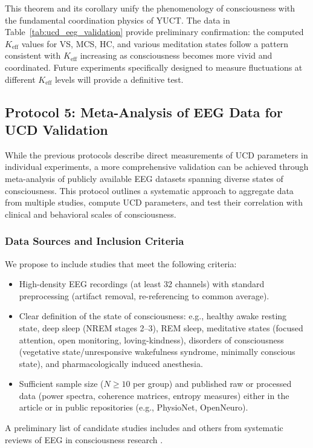 \documentclass[12pt,a4paper]{article}
\newcommand{\Ke}{K_{\mathrm{eff}}}
\begin{document}
	This theorem and its corollary unify the phenomenology of consciousness with the fundamental coordination physics of YUCT. The data in Table~\ref{tab:ucd_eeg_validation} provide preliminary confirmation: the computed \(\Ke\) values for VS, MCS, HC, and various meditation states follow a pattern consistent with \(\Ke\) increasing as consciousness becomes more vivid and coordinated. Future experiments specifically designed to measure fluctuations at different \(\Ke\) levels will provide a definitive test.
	
	\subsection{Protocol 5: Meta-Analysis of EEG Data for UCD Validation}
	\label{sec:protocol5}
	
	While the previous protocols describe direct measurements of UCD parameters in individual experiments, a more comprehensive validation can be achieved through meta-analysis of publicly available EEG datasets spanning diverse states of consciousness. This protocol outlines a systematic approach to aggregate data from multiple studies, compute UCD parameters, and test their correlation with clinical and behavioral scales of consciousness.
	
	\subsubsection{Data Sources and Inclusion Criteria}
	We propose to include studies that meet the following criteria:
	\begin{itemize}
		\item High-density EEG recordings (at least 32 channels) with standard preprocessing (artifact removal, re-referencing to common average).
		\item Clear definition of the state of consciousness: e.g., healthy awake resting state, deep sleep (NREM stages 2–3), REM sleep, meditative states (focused attention, open monitoring, loving-kindness), disorders of consciousness (vegetative state/unresponsive wakefulness syndrome, minimally conscious state), and pharmacologically induced anesthesia.
		\item Sufficient sample size (\(N \geq 10\) per group) and published raw or processed data (power spectra, coherence matrices, entropy measures) either in the article or in public repositories (e.g., PhysioNet, OpenNeuro).
	\end{itemize}
	A preliminary list of candidate studies includes \cite{Zhao2025, Lutz2017, Kozhemyako2017, RoyalSociety2024} and others from systematic reviews of EEG in consciousness research \cite{Laureys2005, Demertzi2019}.
	
\end{document}
